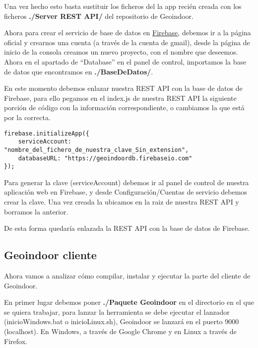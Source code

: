 Una vez hecho esto basta sustituir los ficheros del la app recién creada con los ficheros \textbf{./Server REST API/} del repositorio de Geoindoor.


Ahora para crear el servicio de base de datos en \href{http://firebase.google.com/}{Firebase}, debemos ir a la página oficial y crearnos una cuenta (a través de la cuenta de gmail), desde la página de inicio de la consola creamos un nuevo proyecto, con el nombre que deseemos. Ahora en el apartado de ``Database'' en el panel de control, importamos la base de datos que encontramos en \textbf{./BaseDeDatos/}. 



En este momento debemos enlazar nuestra REST API con la base de datos de Firebase, para ello pegamos en el index.js de nuestra REST API la siguiente porción de código con la información correspondiente, o cambiamos la que está por la correcta.


\begin{verbatim}
firebase.initializeApp({
	serviceAccount: "nombre_del_fichero_de_nuestra_clave_Sin_extension",
	databaseURL: "https://geoindoordb.firebaseio.com"
});
\end{verbatim}


Para generar la clave (serviceAccount) debemos ir al panel de control de nuestra aplicación web en Firebase, y desde Configuración/Cuentas de servicio debemos crear la clave. Una vez creada la ubicamos en la raiz de nuestra REST API y borramos la anterior.

De esta forma quedaría enlazada la REST API con la base de datos de Firebase.

\cite{herokutut}

\subsection{Geoindoor cliente}

Ahora vamos a analizar cómo compilar, instalar y ejecutar la parte del cliente de Geoindoor.

En primer lugar debemos poner \textbf{./Paquete Geoindoor} en el directorio en el que se quiera trabajar, para lanzar la herramienta se debe ejecutar el lanzador (inicioWindows.bat o inicioLinux.sh), Geoindoor se lanzará en el puerto 9000 (localhost). En Windows, a través de Google Chrome y en Linux a través de Firefox.

